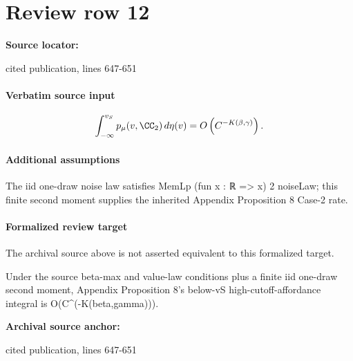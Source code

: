 \documentclass[10pt]{article}
\begin{document}
\section*{Review row 12}
\textbf{Source locator:} {\footnotesize\raggedright cited publication, lines 647-\allowbreak{}651\par}
\paragraph{Verbatim source input}
\begin{ReviewVerbatim}
\begin{proposition}\label{prop:goose-2}
    \begin{equation}
    \int_{-\infty}^{v_S} p_\mu(v, \CC_2)\,d\eta(v) = O\left(C^{-K(\beta,\gamma)}\right).
\end{equation}
\end{proposition}
\end{ReviewVerbatim}

\paragraph{Additional assumptions}
\begin{sloppypar}
The iid one-draw noise law satisfies MemLp (fun x : ℝ => x) 2 noiseLaw; this finite second moment supplies the inherited Appendix Proposition 8 Case-2 rate.
\end{sloppypar}
\paragraph{Formalized review target}
The archival source above is not asserted equivalent to this formalized target.
\begin{ReviewVerbatim}
Under the source beta-max and value-law conditions plus a finite iid one-draw second moment, Appendix Proposition 8's below-vS high-cutoff-affordance integral is O(C^(-K(beta,gamma))).
\end{ReviewVerbatim}

\textbf{Archival source anchor:} {\footnotesize\raggedright cited publication, lines 647-\allowbreak{}651\par}
\end{document}
